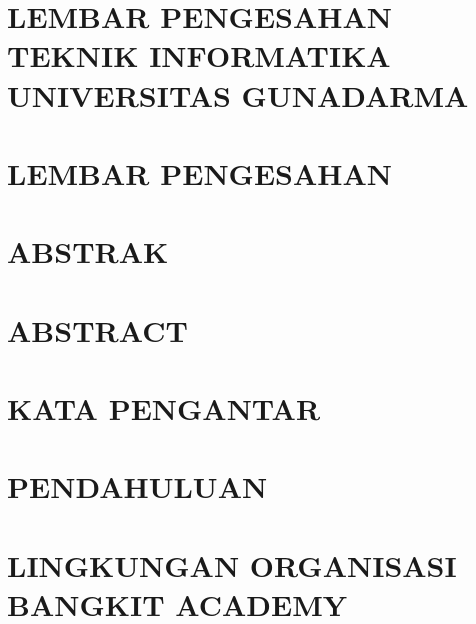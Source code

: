 \documentclass[12pt, a4paper, onecolumn, oneside, final]{report}
\begin{document}
\singlespacing



\setcounter{page}{1}
\singlespacing

\chapter*{LEMBAR PENGESAHAN TEKNIK INFORMATIKA UNIVERSITAS GUNADARMA}


\chapter*{LEMBAR PENGESAHAN}


\chapter*{ABSTRAK}


\chapter*{ABSTRACT}


\chapter*{KATA PENGANTAR}


\singlespacing
\thispagestyle{plain}
\tableofcontents
\thispagestyle{plain}
\listoffigures
\clearpage

\doublespacing
\renewcommand{\thechapter}{\Roman{chapter}}
\renewcommand{\thesection}{\arabic{chapter}.\arabic{section}}
\renewcommand{\thefigure}{\arabic{chapter}.\arabic{figure}}
\renewcommand{\thetable}{\arabic{chapter}.\arabic{table}}
\renewcommand{\thelstlisting}{\arabic{lstlisting}}

\chapter{PENDAHULUAN} 
 

\chapter{LINGKUNGAN ORGANISASI BANGKIT ACADEMY}

\end{document}
